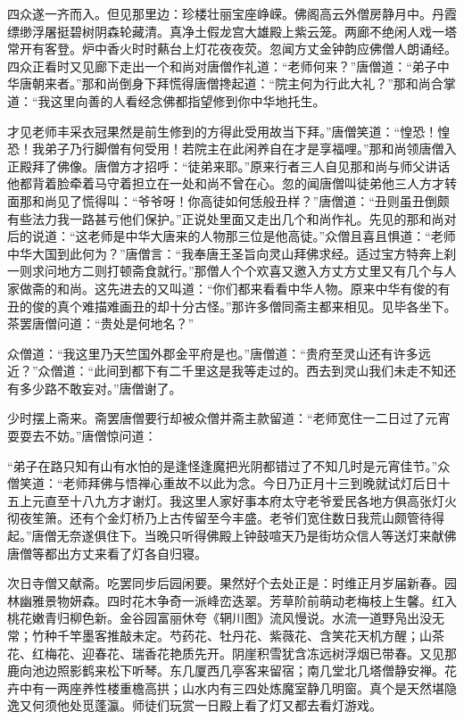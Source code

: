 \documentclass[12pt,UTF8]{ctexbook}
\begin{document}
{	四众遂一齐而入。但见那里边：珍楼壮丽宝座峥嵘。佛阁高云外僧房静月中。丹霞缥缈浮屠挺碧树阴森轮藏清。真净土假龙宫大雄殿上紫云笼。两廊不绝闲人戏一塔常开有客登。炉中香火时时爇台上灯花夜夜荧。忽闻方丈金钟韵应佛僧人朗诵经。四众正看时又见廊下走出一个和尚对唐僧作礼道：“老师何来？”唐僧道：“弟子中华唐朝来者。”那和尚倒身下拜慌得唐僧搀起道：“院主何为行此大礼？”那和尚合掌道：“我这里向善的人看经念佛都指望修到你中华地托生。
	
	才见老师丰采衣冠果然是前生修到的方得此受用故当下拜。”唐僧笑道：“惶恐！惶恐！我弟子乃行脚僧有何受用！若院主在此闲养自在才是享福哩。”那和尚领唐僧入正殿拜了佛像。唐僧方才招呼：“徒弟来耶。”原来行者三人自见那和尚与师父讲话他都背着脸牵着马守着担立在一处和尚不曾在心。忽的闻唐僧叫徒弟他三人方才转面那和尚见了慌得叫：“爷爷呀！你高徒如何恁般丑样？”唐僧道：“丑则虽丑倒颇有些法力我一路甚亏他们保护。”正说处里面又走出几个和尚作礼。先见的那和尚对后的说道：“这老师是中华大唐来的人物那三位是他高徒。”众僧且喜且惧道：“老师中华大国到此何为？”唐僧言：“我奉唐王圣旨向灵山拜佛求经。适过宝方特奔上刹一则求问地方二则打顿斋食就行。”那僧人个个欢喜又邀入方丈方丈里又有几个与人家做斋的和尚。这先进去的又叫道：“你们都来看看中华人物。原来中华有俊的有丑的俊的真个难描难画丑的却十分古怪。”那许多僧同斋主都来相见。见毕各坐下。茶罢唐僧问道：“贵处是何地名？”
	
	众僧道：“我这里乃天竺国外郡金平府是也。”唐僧道：“贵府至灵山还有许多远近？”众僧道：“此间到都下有二千里这是我等走过的。西去到灵山我们未走不知还有多少路不敢妄对。”唐僧谢了。
	
	少时摆上斋来。斋罢唐僧要行却被众僧并斋主款留道：“老师宽住一二日过了元宵耍耍去不妨。”唐僧惊问道：
	
	“弟子在路只知有山有水怕的是逢怪逢魔把光阴都错过了不知几时是元宵佳节。”众僧笑道：“老师拜佛与悟禅心重故不以此为念。今日乃正月十三到晚就试灯后日十五上元直至十八九方才谢灯。我这里人家好事本府太守老爷爱民各地方俱高张灯火彻夜笙箫。还有个金灯桥乃上古传留至今丰盛。老爷们宽住数日我荒山颇管待得起。”唐僧无奈遂俱住下。当晚只听得佛殿上钟鼓喧天乃是街坊众信人等送灯来献佛唐僧等都出方丈来看了灯各自归寝。
	
	次日寺僧又献斋。吃罢同步后园闲要。果然好个去处正是：时维正月岁届新春。园林幽雅景物妍森。四时花木争奇一派峰峦迭翠。芳草阶前萌动老梅枝上生馨。红入桃花嫩青归柳色新。金谷园富丽休夸《辋川图》流风慢说。水流一道野凫出没无常；竹种千竿墨客推敲未定。芍药花、牡丹花、紫薇花、含笑花天机方醒；山茶花、红梅花、迎春花、瑞香花艳质先开。阴崖积雪犹含冻远树浮烟已带春。又见那鹿向池边照影鹤来松下听琴。东几厦西几亭客来留宿；南几堂北几塔僧静安禅。花卉中有一两座养性楼重檐高拱；山水内有三四处炼魔室静几明窗。真个是天然堪隐逸又何须他处觅蓬瀛。师徒们玩赏一日殿上看了灯又都去看灯游戏。
	
}
\end{document}
